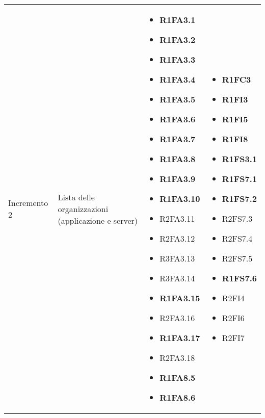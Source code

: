 {\begin{longtable}{C{3cm} C{4cm} C{4cm} C{4cm}}
Incremento 2 & Lista delle organizzazioni (applicazione e server) & \begin{itemize}
    \item[ ] \textbf{R1FA3.1}
    \item[ ] \textbf{R1FA3.2}
    \item[ ] \textbf{R1FA3.3}
    \item[ ] \textbf{R1FA3.4}
    \item[ ] \textbf{R1FA3.5}
    \item[ ] \textbf{R1FA3.6}
    \item[ ] \textbf{R1FA3.7}
    \item[ ] \textbf{R1FA3.8}
    \item[ ] \textbf{R1FA3.9}
    \item[ ] \textbf{R1FA3.10}
    \item[ ] R2FA3.11
    \item[ ] R2FA3.12
    \item[ ] R3FA3.13
    \item[ ] R3FA3.14
    \item[ ] \textbf{R1FA3.15}
    \item[ ] R2FA3.16
    \item[ ] \textbf{R1FA3.17}
    \item[ ] R2FA3.18 
    \item[ ] \textbf{R1FA8.5}
    \item[ ] \textbf{R1FA8.6}
\end{itemize} & \begin{itemize} 
    \item[ ] \textbf{R1FC3}
    \item[ ] \textbf{R1FI3}
    \item[ ] \textbf{R1FI5}
    \item[ ] \textbf{R1FI8}
    \item[ ] \textbf{R1FS3.1}
    \item[ ] \textbf{R1FS7.1}
    \item[ ] \textbf{R1FS7.2}
    \item[ ] R2FS7.3
    \item[ ] R2FS7.4
    \item[ ] R2FS7.5 
    \item[ ] \textbf{R1FS7.6}
    \item[ ] R2FI4
    \item[ ] R2FI6
    \item[ ] R2FI7
\end{itemize}\\


\end{longtable}}
